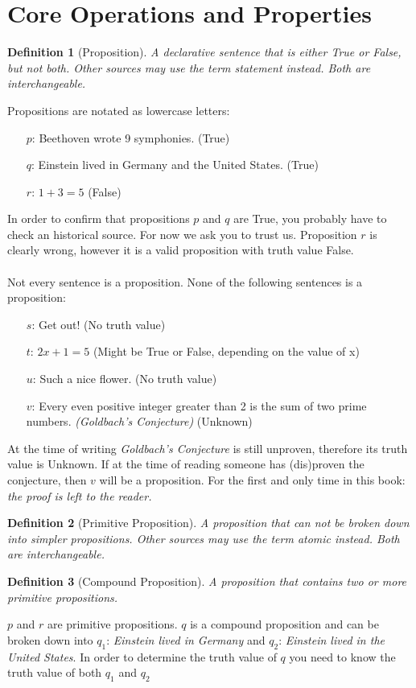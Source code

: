 \documentclass[10pt,a4paper,draft,titlepage,onecolumn]{book}
\newtheorem{definition}{Definition}[subsection]
\begin{document}
\section{Core Operations and Properties}
\begin{definition}[Proposition]
A declarative sentence that is either True or False, but not both. Other sources may use the term \textit{statement} instead. Both are interchangeable. 
\end{definition}
Propositions are notated as lowercase letters:
\begin{itemize}
 \item[$p$:]Beethoven wrote 9 symphonies. (True)
 \item[$q$:]Einstein lived in Germany and the United States. (True)
 \item[$r$:]$ 1 + 3 = 5 $ (False)
\end{itemize} 
In order to confirm that propositions $p$ and $q$ are True, you probably have to check an historical source. For now we ask you to trust us. 
Proposition $r$ is clearly wrong, however it is a valid proposition with truth value False. \\ \\
Not every sentence is a proposition. None of the following sentences is a proposition:
\begin{itemize}
 \item[$s$:]Get out! (No truth value)
 \item[$t$:]$2x+1=5$ (Might be True or False, depending on the value of x)
 \item[$u$:]Such a nice flower. (No truth value)
 \item[$v$:]Every even positive integer greater than 2 is the sum of two prime numbers. \textit{(Goldbach’s Conjecture)} (Unknown)
\end{itemize}
At the time of writing \textit{Goldbach's Conjecture} is still unproven, therefore its truth value is Unknown. If at the time of reading someone has (dis)proven the conjecture, then $v$ will be a proposition. For the first and only time in this book: \textit{the proof is left to the reader.}

\begin{definition}[Primitive Proposition]
A proposition that can not be broken down into simpler propositions. Other sources may use the term \textit{atomic} instead. Both are interchangeable. 
\end{definition}

\begin{definition}[Compound Proposition]
A proposition that contains two or more primitive propositions.  
\end{definition}
$p$ and $r$ are primitive propositions. 
$q$ is a compound proposition and can be broken down into $q_1$: \textit{Einstein lived in Germany} and $q_2$:\textit{ Einstein lived in the United States}. In order to determine the truth value of $q$ you need to know the truth value of both $q_1$ and $q_2$  \\
\end{document}
